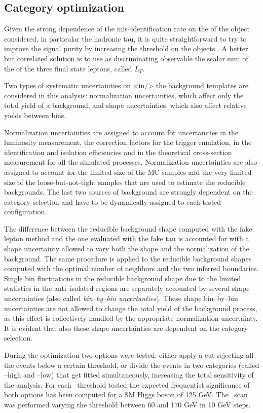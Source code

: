 \subsection{Category optimization}

Given the strong dependence of the mis--identification rate on the \pT of the object considered, in particular the hadronic tau, it is quite straightforward to try to improve the signal purity by increasing the threshold on the objects \pT. A better but correlated solution is to use as discriminating observable the scalar sum of the \pT of the three final state leptons, called $L_T$.  

Two types of systematic uncertainties on <in/> the background templates are considered in this analysis: normalization uncertainties, which affect only the total yield of a background, and shape uncertainties, which also affect relative yields between bins.

Normalization uncertainties are assigned to account for uncertainties in the luminosity measurement, the correction factors for the trigger emulation, in the identification and isolation efficiencies and in the theoretical cross-section measurement for all the simulated processes. Normalization uncertainties are also assigned to account for the limited size of the MC samples and the very limited size of the loose-but-not-tight samples that are used to estimate the reducible backgrounds. The last two sources of background are strongly dependent on the category selection and have to be dynamically assigned to each tested configuration.

The difference between the reducible background shape computed with the fake lepton method and the one evaluated with the fake tau is accounted for with a shape uncertainty allowed to vary both the shape and the normalization of the background. The same procedure is applied to the reducible background shapes computed with the optimal number of neighbors and the two inferred boundaries. Single bin fluctuations in the reducible background shape due to the limited statistics in the anti--isolated regions are separately accounted by several shape uncertainties (also called \emph{bin--by--bin uncertanties}). These shape bin--by--bin uncertainties are not allowed to change the total yield of the background process, as this effect is collectively handled by the appropriate normalization uncertainty. It is evident that also these shape uncertainties are dependent on the category selection.

During the optimization two options were tested: either apply a cut rejecting all the events below a certain \LT threshold, or divide the events in two categories (called \LT--high and \LT--low) that get fitted simultaneously, increasing the total sensitivity of the analysis. For each \LT \ threshold tested the expected frequentist significance of both options has been computed for a SM Higgs boson of 125 GeV. The \LT\ scan was performed varying the threshold between 60 and 170 GeV in 10 GeV steps. 

